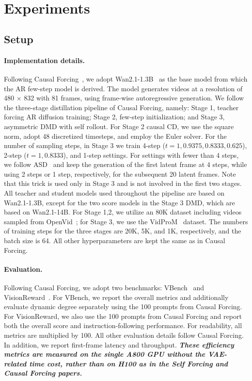 \section{Experiments}
\subsection{Setup}
\label{sec: setup}

\paragraph{Implementation details.} Following Causal Forcing~\cite{zhu2026causal}, we adopt Wan2.1-1.3B~\cite{wan2025wan} as the base model from which the AR few-step model is derived. The model generates videos at a resolution of 480 $\times$ 832 with 81 frames, using frame-wise autoregressive generation. We follow the three-stage distillation pipeline of Causal Forcing, namely: Stage 1, teacher forcing AR diffusion training; Stage 2, few-step initialization; and Stage 3, asymmetric DMD with self rollout. For Stage 2 causal CD, we use the square norm, adopt 48 discretized timesteps, and employ the Euler solver.
 For the number of sampling steps, in Stage 3 we train 4-step ($t=1,0.9375,0.8333,0.625$), 2-step ($t=1,0.8333$), and 1-step settings. For settings with fewer than 4 steps, we follow ASD~\cite{yang2025towards} and keep the generation of the first latent frame at 4 steps, while using 2 steps or 1 step, respectively, for the subsequent 20 latent frames. Note that this trick is used only in Stage 3 and is not involved in the first two stages. All teacher and student models used throughout the pipeline are based on Wan2.1-1.3B, except for the two score models in the Stage 3 DMD, which are based on Wan2.1-14B. For Stage 1,2, we utilize an 80K dataset including videos sampled from OpenVid~\cite{nan2024openvid}; for Stage 3, we use the  VidProM~\cite{wang2024vidprom} dataset. The numbers of training steps for the three stages are 20K, 5K, and 1K, respectively, and the batch size is 64. All other hyperparameters are kept the same as in Causal Forcing. 

\paragraph{Evaluation.} Following Causal Forcing, we adopt two benchmarks: VBench~\cite{huang2024vbench} and VisionReward~\cite{xu2024visionreward}. For VBench, we report the overall metrics and additionally evaluate dynamic degree separately using the 100 prompts from Causal Forcing. For VisionReward, we also use the 100 prompts from Causal Forcing and report both the overall score and instruction-following performance. For readability, all metrics are multiplied by 100. All other evaluation details follow Causal Forcing. In addition, we report first-frame latency and throughput. \textit{\textbf{These efficiency metrics are measured \emph{on the single A800 GPU without the VAE-related time cost}, rather than on H100 as in the Self Forcing and Causal Forcing papers.}}

